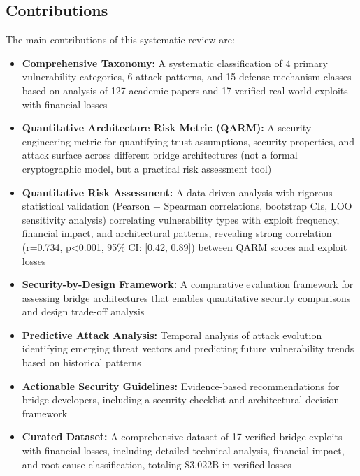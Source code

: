 \documentclass[runningheads]{llncs}
\begin{document}
\subsection{Contributions}
The main contributions of this systematic review are:

\begin{itemize}
    \item \textbf{Comprehensive Taxonomy:} A systematic classification of 4 primary vulnerability categories, 6 attack patterns, and 15 defense mechanism classes based on analysis of 127 academic papers and 17 verified real-world exploits with financial losses
    
    \item \textbf{Quantitative Architecture Risk Metric (QARM):} A security engineering metric for quantifying trust assumptions, security properties, and attack surface across different bridge architectures (not a formal cryptographic model, but a practical risk assessment tool)
    
    \item \textbf{Quantitative Risk Assessment:} A data-driven analysis with rigorous statistical validation (Pearson + Spearman correlations, bootstrap CIs, LOO sensitivity analysis) correlating vulnerability types with exploit frequency, financial impact, and architectural patterns, revealing strong correlation (r=0.734, p<0.001, 95\% CI: [0.42, 0.89]) between QARM scores and exploit losses
    
    \item \textbf{Security-by-Design Framework:} A comparative evaluation framework for assessing bridge architectures that enables quantitative security comparisons and design trade-off analysis
    
    \item \textbf{Predictive Attack Analysis:} Temporal analysis of attack evolution identifying emerging threat vectors and predicting future vulnerability trends based on historical patterns
    
    \item \textbf{Actionable Security Guidelines:} Evidence-based recommendations for bridge developers, including a security checklist and architectural decision framework
    
    \item \textbf{Curated Dataset:} A comprehensive dataset of 17 verified bridge exploits with financial losses, including detailed technical analysis, financial impact, and root cause classification, totaling \$3.022B in verified losses
\end{itemize}
\end{document}
